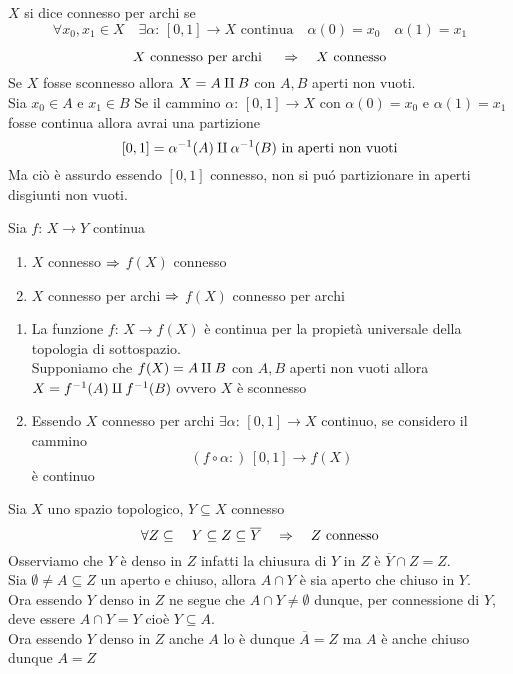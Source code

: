 \spazio
\begin{defn}\bianco
$X$ si dice connesso per archi se 
$$ \forall x_0,x_1 \in X \quad \exists \alpha:\, [0,1]\to X \text{ continua} \quad \alpha(0)=x_0 \quad \alpha(1)=x_1$$
\end{defn}
\begin{prop}
$$ X \text{ connesso per archi } \quad \Rightarrow \quad X \text{ connesso}$$
\proof Se $X$ fosse sconnesso allora $X= A \amalg B $ con $A,B$ aperti non vuoti.\\
Sia $x_0 \in A $ e $x_1 \in B $
Se il cammino $\alpha:\, [0,1]\to X$ con $\alpha(0)=x_0$ e $\alpha(1)=x_1$ fosse continua allora avrai una partizione 
$$ [0,1]=\alpha^{-1}(A) \amalg \alpha^{-1}(B) \text{ in aperti non vuoti}$$
Ma ci\`o \`e assurdo essendo $[0,1]$ connesso, non si pu\'o partizionare in aperti disgiunti non vuoti.\endproof
\end{prop}
\begin{prop}Sia $f:\, X \to Y$ continua
\begin{enumerate}
\item $X$ connesso $\Rightarrow$ $f(X)$ connesso
\item $X$ connesso per archi $\Rightarrow$ $f(X)$ connesso per archi
\end{enumerate}
\proof
\begin{enumerate}
\item La funzione $f:\, X \to f(X)$ \`e continua per la propiet\`a universale della topologia di sottospazio.\\
Supponiamo che $f(X)= A \amalg B$ con $A,B$ aperti non vuoti allora
$X = f^{-1}(A) \amalg f^{-1}(B)$ ovvero $X$ \`e sconnesso
\item Essendo $X$ connesso per archi $\exists \alpha:\, [0,1]\to X $ continuo, se considero il cammino $$(f \circ \alpha:)\, [0,1]\to f(X)$$ \`e continuo 
\end{enumerate}
\end{prop}
\spazio
\begin{lem}Sia $X$ uno spazio topologico, $Y \subseteq X$ connesso
$$ \forall Z \subseteq \quad Y \subseteq Z \subseteq \overline{Y} \quad \Rightarrow \quad Z \text{ connesso}$$
\proof Osserviamo che $Y$ \`e denso in $Z$ infatti la chiusura di $Y$ in $Z$ \`e $\overline{Y} \cap Z  = Z $.\\
Sia $\emptyset\neq A\subseteq Z$ un aperto e chiuso, allora $A \cap Y$ \`e sia aperto che chiuso in $Y$.\\
Ora essendo $Y$ denso in $Z$ ne segue che $A \cap Y \neq \emptyset$ dunque, per connessione di $Y$, deve essere $A \cap Y=Y$ cio\`e $Y\subseteq A$.\\
Ora essendo $Y$ denso in $Z$ anche $A$ lo \`e dunque $\overline{A}=Z$ ma $A$ \`e anche chiuso dunque $A=Z$
\endproof
\end{lem}
